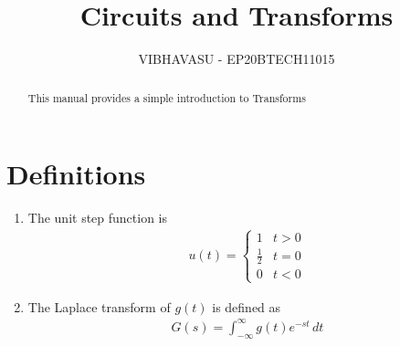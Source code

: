\documentclass[journal,12pt,twocolumn]{IEEEtran}
\renewcommand\thesection{\arabic{section}}
\begin{document}
	\let\StandardTheFigure\thefigure
	\renewcommand{\thefigure}{\theproblem}
	\renewcommand{\thefigure}{\arabic{section}.\arabic{figure}}
	\makeatletter
	\makeatother
	
	
	\def\putbox#1#2#3{\makebox[0in][l]{\makebox[#1][l]{}\raisebox{\baselineskip}[0in][0in]{\raisebox{#2}[0in][0in]{#3}}}}
	\def\rightbox#1{\makebox[0in][r]{#1}}
	\def\centbox#1{\makebox[0in]{#1}}
	\def\topbox#1{\raisebox{-\baselineskip}[0in][0in]{#1}}
	\def\midbox#1{\raisebox{-0.5\baselineskip}[0in][0in]{#1}}
	
	\vspace{3cm}

	\vspace{3cm}
	
	\title{ 
		Circuits and Transforms
	}
	\author{VIBHAVASU - EP20BTECH11015}


\maketitle


\tableofcontents


\renewcommand{\thefigure}{\theenumi}
\renewcommand{\thetable}{\theenumi}



\bigskip

\begin{abstract}
This manual provides a simple introduction to Transforms
\end{abstract}



\section{Definitions}
\begin{enumerate}[label=\arabic*.,ref=\thesection.\theenumi]
\item The unit step function is 
\begin{align}
	u(t) =
	\begin{cases}
		1 & t > 0
		\\
		\frac{1}{2} & t = 0
		\\
		0 & t < 0
	\end{cases}
\end{align}
\item The Laplace transform of $g(t)$ is defined as 
\begin{align}
	G(s) = \int_{-\infty}^{\infty} g(t) e^{-st}\, dt
\end{align}
\end{enumerate}
\end{document}
